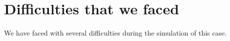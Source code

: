 \section{Difficulties that we faced}

\paragraph{}We have faced with several difficulties during the simulation of this case.
